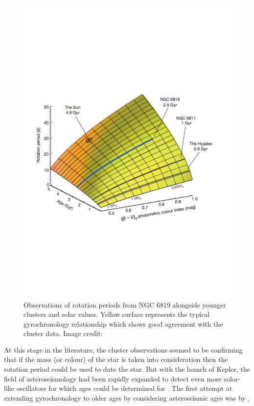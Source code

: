 \begin{figure}
    \centering
    \includegraphics[scale=0.55]{Figures/2-Historical_overview/meibom_etal_2015.pdf}
    \caption[Comparison of data from 2.5 Gyr old cluster to previous gyrochronology relationship]{Observations of rotation periods from NGC 6819 alongside younger clusters and solar values. Yellow surface represents the typical gyrochronology relationship which shows good agreement with the cluster data. Image credit: \citet{Meibom_etal_2015}}
    \label{fig:Meibom_etal_2015_plot}
\end{figure}

At this stage in the literature, the cluster observations seemed to be confirming that if the mass (or colour) of the star is taken into consideration then the rotation period could be used to date the star. But with the launch of Kepler, the field of asteroseismology had been rapidly expanded to detect even more solar-like oscillators for which ages could be determined for \citep{Chaplin_etal_2011}. The first attempt at extending gyrochronology to older ages by considering asteroseismic ages was by \citet{Angus_etal_2015}.

